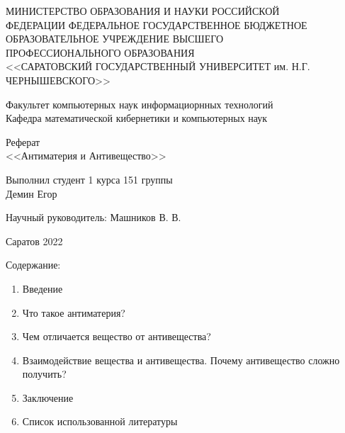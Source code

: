 \thispagestyle{empty}
    \begin{center}
        МИНИСТЕРСТВО ОБРАЗОВАНИЯ И НАУКИ РОССИЙСКОЙ \\
        ФЕДЕРАЦИИ ФЕДЕРАЛЬНОЕ ГОСУДАРСТВЕННОЕ БЮДЖЕТНОЕ \\ 
        ОБРАЗОВАТЕЛЬНОЕ УЧРЕЖДЕНИЕ ВЫСШЕГО \\
        ПРОФЕССИОНАЛЬНОГО ОБРАЗОВАНИЯ \\
        <<САРАТОВСКИЙ ГОСУДАРСТВЕННЫЙ УНИВЕРСИТЕТ им. Н.Г.\\
        ЧЕРНЫШЕВСКОГО>>
      \vspace*{42pt}

       Факультет компьютерных наук информациорнных технологий \\
       Кафедра математической кибернетики и компьютерных наук
      \vspace*{112pt}

       Реферат\\
       <<Антиматерия и Антивещество>>
      \vspace*{112pt}      
  \end{center}

  \begin{flushright}
    Выполнил студент 1 курса 151 группы \\
    Демин Егор
    \vspace*{14pt}

    Научный руководитель: Машников В. В.\\
  \end{flushright}
  \vspace*{182pt}

  \centering
  Саратов 2022

  \newpage
  \thispagestyle{empty}
  \begin{flushleft}
  Содержание:
  \begin{enumerate} 
    \item Введение
    \item Что такое антиматерия?
    \item Чем отличается вещество от антивещества?
    \item Взаимодействие вещества и антивещества. Почему антивещество сложно получить?
    \item Заключение
    \item Список использованной литературы
  \end{enumerate}
  \newpage
  \end{flushleft}
  